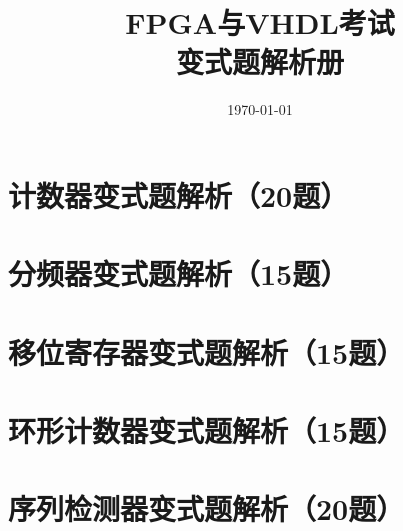 \documentclass[12pt,a4paper,openany]{ctexbook}
\title{\Huge\textbf{FPGA与VHDL考试\\变式题解析册}}
\author{}
\date{\today}
\begin{document}
\maketitle
\tableofcontents

\part{计数器变式题解析（20题）}


\part{分频器变式题解析（15题）}


\part{移位寄存器变式题解析（15题）}


\part{环形计数器变式题解析（15题）}


\part{序列检测器变式题解析（20题）}

\end{document}
